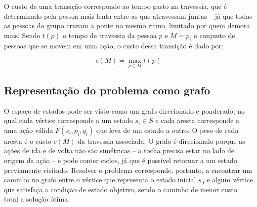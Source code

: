 O custo de uma transição corresponde ao tempo gasto na travessia, que é
determinado pela pessoa mais lenta entre as que atravessam juntas -- já que
todas as pessoas do grupo cruzam a ponte no mesmo ritmo, limitado por quem
demora mais. Sendo $t(p)$ o tempo de travessia da pessoa $p$ e $M = p_i$ o
conjunto de pessoas que se movem em uma ação, o custo dessa transição é dado
por:

\[
	c(M) = \max_{p \in M} t(p)
\]

\subsection{Representação do problema como grafo}

O espaço de estados pode ser visto como um grafo direcionado e ponderado, no
qual cada vértice corresponde a um estado $s_i \in S$ e cada aresta
corresponde a uma ação válida $F(s_i, p_i, q_i)$ que leva de um estado a
outro. O peso de cada aresta é o custo $c(M)$ da travessia associada. O grafo
é direcionado porque as ações de ida e de volta não são simétricas -- a tocha
precisa estar no lado de origem da ação -- e pode conter ciclos, já que é
possível retornar a um estado previamente visitado. Resolver o problema
corresponde, portanto, a encontrar um caminho no grafo entre o vértice que
representa o estado inicial $s_0$ e algum vértice que satisfaça a condição de
estado objetivo, sendo o caminho de menor custo total a solução ótima.
